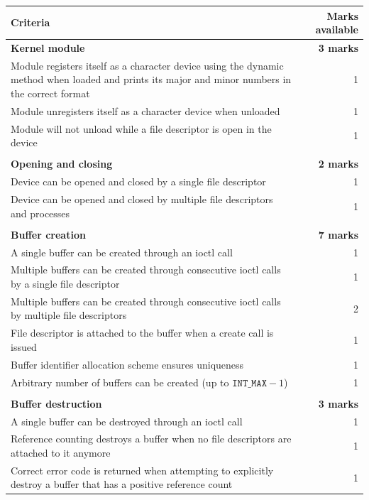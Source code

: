 \documentclass[12pt,a4paper]{article}
\begin{document}
\begin{longtable}{p{13cm} r}
    \toprule
    \textbf{Criteria} & \textbf{Marks available} \\
    \midrule

    \textbf{Kernel module} & \textbf{3 marks} \\
    Module registers itself as a character device using the dynamic method when loaded and prints its major and minor numbers in the correct format & 1 \\
    Module unregisters itself as a character device when unloaded & 1 \\
    Module will not unload while a file descriptor is open in the device & 1 \\

    & \\
    \midrule
    \textbf{Opening and closing} & \textbf{2 marks} \\
    Device can be opened and closed by a single file descriptor & 1 \\
    Device can be opened and closed by multiple file descriptors and processes & 1 \\

    & \\
    \midrule
    \textbf{Buffer creation} & \textbf{7 marks} \\
    A single buffer can be created through an ioctl call & 1 \\
    Multiple buffers can be created through consecutive ioctl calls by a single file descriptor & 1 \\
    Multiple buffers can be created through consecutive ioctl calls by multiple file descriptors & 2 \\
    File descriptor is attached to the buffer when a create call is issued & 1 \\
    Buffer identifier allocation scheme ensures uniqueness & 1 \\
    Arbitrary number of buffers can be created (up to $\texttt{INT\_MAX}-1$) & 1 \\

    & \\
    \midrule
    \textbf{Buffer destruction} & \textbf{3 marks} \\
    A single buffer can be destroyed through an ioctl call & 1 \\
    Reference counting destroys a buffer when no file descriptors are attached to it anymore & 1 \\
    Correct error code is returned when attempting to explicitly destroy a buffer that has a positive reference count & 1 \\


\end{longtable}
\end{document}
